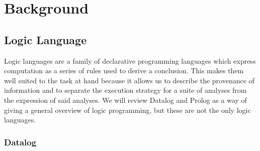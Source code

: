 \chapter{Background}
\label{chap:background}
\section{Logic Language}
Logic languages are a family of declarative programming languages which express computation as a series of rules used to derive a conclusion.
This makes them well suited to the task at hand because it allows us to describe the provenance of information and to separate the execution strategy for a suite of analyses from the expression of said analyses.
We will review Datalog and Prolog as a way of giving a general overview of logic programming, but these are not the only logic languages.
\subsection{Datalog}
\label{sec:fchain}
